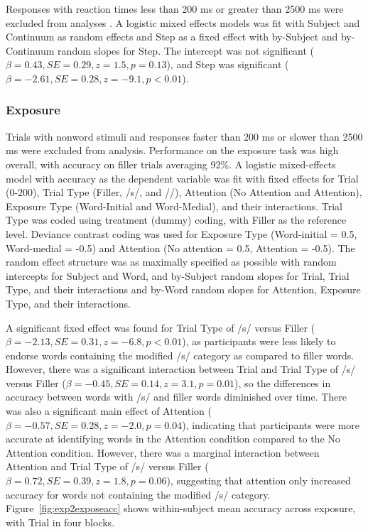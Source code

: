 Responses with reaction times less than 200 ms or greater than 2500 ms were excluded from analyses  \citep[following][]{Reinisch2013}. 
A logistic mixed effects models was fit with Subject and Continuum as random effects and Step as a fixed effect with by-Subject and by-Continuum random slopes for Step. 
The intercept was not significant ($\beta = 0.43, SE = 0.29, z = 1.5, p = 0.13$), and Step was significant ($\beta = -2.61, SE = 0.28, z = -9.1, p < 0.01$).

\subsubsection{Exposure}

Trials with nonword stimuli and responses faster than 200 ms or slower than 2500 ms were excluded from analysis. 
Performance on the exposure task was high overall, with accuracy on filler trials averaging 92\%.  
A logistic mixed-effects model with accuracy as the dependent variable was fit with fixed effects for Trial (0-200), Trial Type (Filler, /s/, and /\textesh/), Attention (No Attention and Attention), Exposure Type (Word-Initial and Word-Medial), and their interactions.   Trial Type was coded using treatment (dummy) coding, with Filler as the reference level.  
Deviance contrast coding was used for Exposure Type (Word-initial = 0.5, Word-medial = -0.5) and Attention (No attention = 0.5, Attention = -0.5).
The random effect structure was as maximally specified as possible with random intercepts for Subject and Word, and by-Subject random slopes for Trial, Trial Type, and their interactions and by-Word random slopes for Attention, Exposure Type, and their interactions. 

A significant fixed effect was found for Trial Type of /s/ versus Filler ($\beta = -2.13, SE = 0.31, z = -6.8, p < 0.01$), as participants were less likely to endorse words containing the modified /s/ category as compared to filler words.
However, there was a significant interaction between Trial and Trial Type of /s/ versus Filler ($\beta = -0.45, SE = 0.14, z = 3.1, p = 0.01$), so the differences in accuracy between words with /s/ and filler words diminished over time.
There was also a significant main effect of Attention ($\beta = -0.57, SE = 0.28, z = -2.0, p = 0.04$), indicating that participants were more accurate at identifying words in the Attention condition compared to the No Attention condition.
However, there was a marginal interaction between Attention and Trial Type of /s/ versus Filler ($\beta = 0.72, SE = 0.39, z = 1.8, p = 0.06$), suggesting that attention only increased accuracy for words not containing the modified /s/ category.
Figure~\ref{fig:exp2exposeacc} shows within-subject mean accuracy across exposure, with Trial in four blocks.

